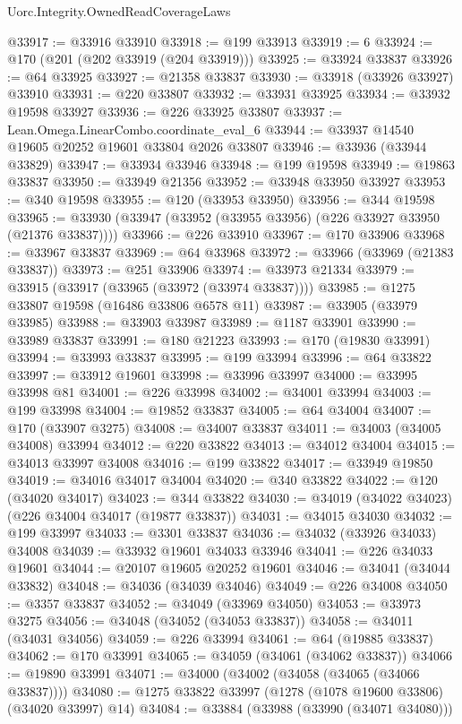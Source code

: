 \begin{lexlean}{Uorc.Integrity.OwnedReadCoverageLaws}
\begin{coremodule}
@33917 := @33916 @33910
@33918 := @199 @33913
@33919 := 6
@33924 := @170 (@201 (@202 @33919 (@204 @33919)))
@33925 := @33924 @33837
@33926 := @64 @33925
@33927 := @21358 @33837
@33930 := @33918 (@33926 @33927) @33910
@33931 := @220 @33807
@33932 := @33931 @33925
@33934 := @33932 @19598 @33927
@33936 := @226 @33925 @33807
@33937 := Lean.Omega.LinearCombo.coordinate_eval_6
@33944 := @33937 @14540 @19605 @20252 @19601 @33804 @2026 @33807
@33946 := @33936 (@33944 @33829)
@33947 := @33934 @33946
@33948 := @199 @19598
@33949 := @19863 @33837
@33950 := @33949 @21356
@33952 := @33948 @33950 @33927
@33953 := @340 @19598
@33955 := @120 (@33953 @33950)
@33956 := @344 @19598
@33965 := @33930 (@33947 (@33952 (@33955 @33956) (@226 @33927 @33950 (@21376 @33837))))
@33966 := @226 @33910
@33967 := @170 @33906
@33968 := @33967 @33837
@33969 := @64 @33968
@33972 := @33966 (@33969 (@21383 @33837))
@33973 := @251 @33906
@33974 := @33973 @21334
@33979 := @33915 (@33917 (@33965 (@33972 (@33974 @33837))))
@33985 := @1275 @33807 @19598 (@16486 @33806 @6578 @11)
@33987 := @33905 (@33979 @33985)
@33988 := @33903 @33987
@33989 := @1187 @33901
@33990 := @33989 @33837
@33991 := @180 @21223
@33993 := @170 (@19830 @33991)
@33994 := @33993 @33837
@33995 := @199 @33994
@33996 := @64 @33822
@33997 := @33912 @19601
@33998 := @33996 @33997
@34000 := @33995 @33998 @81
@34001 := @226 @33998
@34002 := @34001 @33994
@34003 := @199 @33998
@34004 := @19852 @33837
@34005 := @64 @34004
@34007 := @170 (@33907 @3275)
@34008 := @34007 @33837
@34011 := @34003 (@34005 @34008) @33994
@34012 := @220 @33822
@34013 := @34012 @34004
@34015 := @34013 @33997 @34008
@34016 := @199 @33822
@34017 := @33949 @19850
@34019 := @34016 @34017 @34004
@34020 := @340 @33822
@34022 := @120 (@34020 @34017)
@34023 := @344 @33822
@34030 := @34019 (@34022 @34023) (@226 @34004 @34017 (@19877 @33837))
@34031 := @34015 @34030
@34032 := @199 @33997
@34033 := @3301 @33837
@34036 := @34032 (@33926 @34033) @34008
@34039 := @33932 @19601 @34033 @33946
@34041 := @226 @34033 @19601
@34044 := @20107 @19605 @20252 @19601
@34046 := @34041 (@34044 @33832)
@34048 := @34036 (@34039 @34046)
@34049 := @226 @34008
@34050 := @3357 @33837
@34052 := @34049 (@33969 @34050)
@34053 := @33973 @3275
@34056 := @34048 (@34052 (@34053 @33837))
@34058 := @34011 (@34031 @34056)
@34059 := @226 @33994
@34061 := @64 (@19885 @33837)
@34062 := @170 @33991
@34065 := @34059 (@34061 (@34062 @33837))
@34066 := @19890 @33991
@34071 := @34000 (@34002 (@34058 (@34065 (@34066 @33837))))
@34080 := @1275 @33822 @33997 (@1278 (@1078 @19600 @33806) (@34020 @33997) @14)
@34084 := @33884 (@33988 (@33990 (@34071 @34080)))

\end{coremodule}
\end{lexlean}

